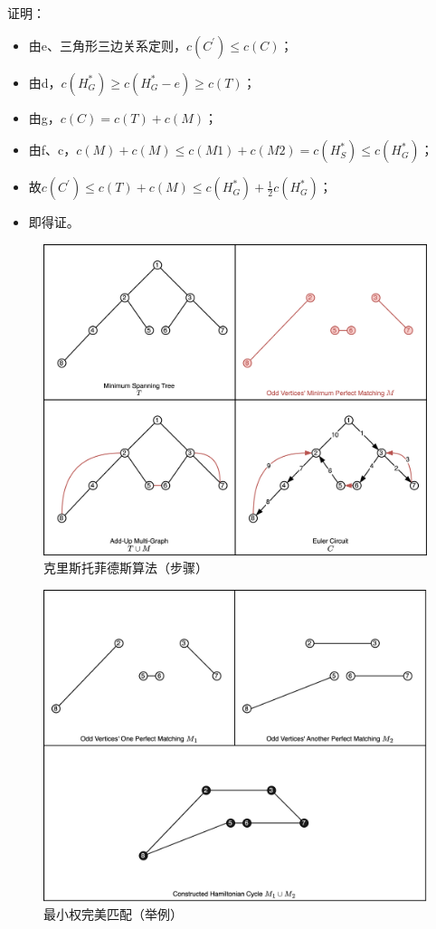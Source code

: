 \documentclass[12pt]{ctexart}
\begin{document}
证明：
\begin{itemize}
    \item 由e、三角形三边关系定则，$c\left(C^\prime\right)\le c\left(C\right)$；
    \item 由d，$c\left(H_G^\ast\right)\geq c\left(H_G^\ast-e\right)\geq c\left(T\right)$；
    \item 由g，$c\left(C\right)=c\left(T\right)+c\left(M\right)$；
    \item 由f、c，$c\left(M\right)+c\left(M\right)\le c\left(M1\right)+c\left(M2\right)=c\left(H_S^\ast\right)\le c\left(H_G^\ast\right)$；
    \item 故$c\left(C^\prime\right)\le c\left(T\right)+c\left(M\right)\le c\left(H_G^\ast\right)+\frac{1}{2}c\left(H_G^\ast\right)$；
    \item 即得证。
\end{itemize}

\begin{figure}[htbp]
    \centering
    \includegraphics[width=0.72\linewidth]{../assets-v1/images/Euler.png}
    \caption{克里斯托菲德斯算法（步骤）}
\end{figure}

\begin{figure}[htbp]
    \centering
    \includegraphics[width=0.72\linewidth]{../assets-v1/images/match.png}
    \caption{最小权完美匹配（举例）}
\end{figure}
\end{document}
